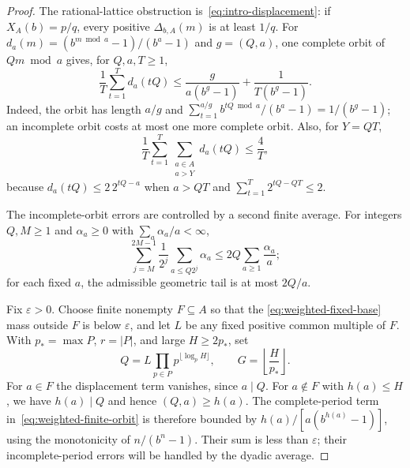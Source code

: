 \documentclass[11pt]{article}
\begin{document}
\begin{proof}
The rational-lattice obstruction is~\eqref{eq:intro-displacement}: if
$X_A(b)=p/q$, every positive $\Delta_{b,A}(m)$ is at least $1/q$.
For $d_a(m)=(b^{m\bmod a}-1)/(b^a-1)$ and $g=(Q,a)$, one complete orbit of
$Qm\bmod a$ gives, for $Q,a,T\ge1$,
\begin{equation}\label{eq:weighted-finite-orbit}
 \frac1T\sum_{t=1}^T d_a(tQ)
 \le \frac{g}{a(b^g-1)}+\frac1{T(b^g-1)}.
\end{equation}
Indeed, the orbit has length $a/g$ and
$\sum_{t=1}^{a/g}b^{tQ\bmod a}/(b^a-1)=1/(b^g-1)$; an incomplete orbit costs
at most one more complete orbit.  Also, for $Y=QT$,
\begin{equation}\label{eq:weighted-outer-short}
 \frac1T\sum_{t=1}^T\sum_{\substack{a\in A\\a>Y}}d_a(tQ)
 \le\frac4T,
\end{equation}
because $d_a(tQ)\le2\,2^{tQ-a}$ when $a>QT$ and
$\sum_{t=1}^T2^{tQ-QT}\le2$.

The incomplete-orbit errors are controlled by a second finite average.  For integers $Q,M\ge1$ and $\alpha_a\ge0$ with $\sum_a\alpha_a/a<\infty$,
\begin{equation}\label{eq:weighted-dyadic-short}
 \sum_{j=M}^{2M-1}\frac1{2^j}\sum_{a\le Q2^j}\alpha_a
 \le2Q\sum_{a\ge1}\frac{\alpha_a}{a};
\end{equation}
for each fixed $a$, the admissible geometric tail is at most $2Q/a$.

Fix $\varepsilon>0$.  Choose finite nonempty $F\subseteq A$ so that the
\eqref{eq:weighted-fixed-base} mass outside $F$ is below $\varepsilon$, and
let $L$ be any fixed positive common multiple of $F$.  With $p_*=\max P$, $r=|P|$, and large
$H\ge2p_*$, set
\[
 Q=L\prod_{p\in P}p^{\lfloor\log_pH\rfloor},\qquad
 G=\left\lfloor\frac H{p_*}\right\rfloor.
\]
For $a\in F$ the displacement term vanishes, since $a\mid Q$.
For $a\notin F$ with $h(a)\le H$, we have $h(a)\mid Q$ and hence
$(Q,a)\ge h(a)$.  The complete-period term
in~\eqref{eq:weighted-finite-orbit} is therefore bounded by
$h(a)/[a(b^{h(a)}-1)]$, using the monotonicity of $n/(b^n-1)$.
Their sum is less than $\varepsilon$; their incomplete-period errors will
be handled by the dyadic average.


\end{proof}
\end{document}
